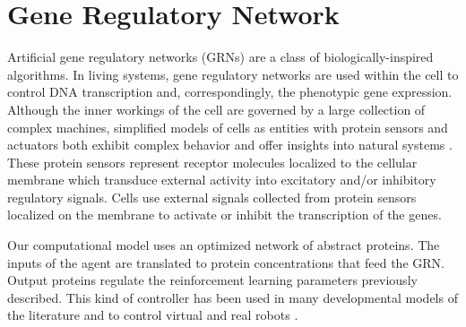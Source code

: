 \section{Gene Regulatory Network}

Artificial gene regulatory networks (GRNs) are a class of biologically-inspired
algorithms. In living systems, gene regulatory networks are used within the cell
to control DNA transcription and, correspondingly, the phenotypic gene
expression. Although the inner workings of the cell are governed by a large collection
of complex machines, simplified models of cells as entities with protein sensors and actuators
both exhibit complex behavior and offer insights into natural systems \cite{Davidson2006}.
These protein sensors represent receptor molecules localized to the cellular membrane
which transduce external activity into excitatory and/or inhibitory regulatory signals.
Cells use external signals collected from protein sensors localized
on the membrane to activate or inhibit the transcription of the genes.

Our computational model uses an optimized network of abstract proteins. The inputs of the
agent are translated to protein concentrations that feed the GRN. Output
proteins regulate the reinforcement learning parameters previously described.
This kind of controller has been used in many developmental models of the
literature \cite{Joachimczak08, Doursat09, CussatBlanc2012a} and to control
virtual and real robots \cite{ziegler2001evolving, Nicolau10, Joachimczak10, CussatBlanc2012b}. 

